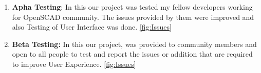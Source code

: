\begin{enumerate}
    \item \textbf{Apha Testing}: In this our project was tested my fellow developers working for OpenSCAD community. The issues provided by them were improved and also Testing of User Interface was done. \ref{fig:Issues}
   
    \item \textbf{Beta Testing:} In this our project, was provided to community members and open to all people to test and report the issues or addition that are required to improve User Experience. \ref{fig:Issues}
   
\end{enumerate}

		
		
